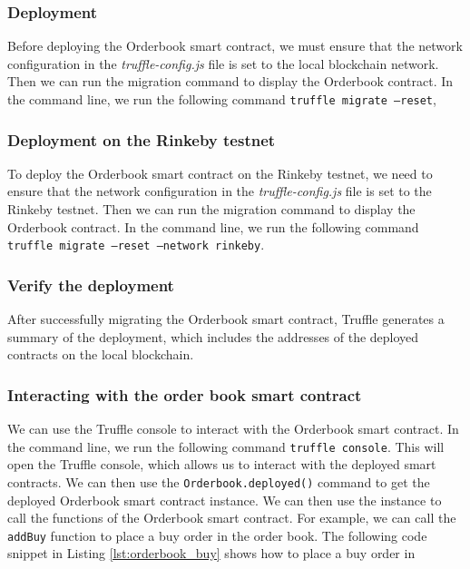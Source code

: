 \subsubsection{Deployment}


Before deploying the Orderbook smart contract, we must ensure that the network configuration in the \textit{truffle-config.js} file is set to the local blockchain
network. Then we can run the migration command to display the Orderbook contract. In the command line, we run the following command \texttt{truffle migrate --reset},


\subsubsection{Deployment on the Rinkeby testnet}


To deploy the Orderbook smart contract on the Rinkeby testnet, we need to ensure that the network configuration in the \textit{truffle-config.js} file is set to the
Rinkeby testnet. Then we can run the migration command to display the Orderbook contract. In the command line, we run the following command \texttt{truffle migrate --reset --network rinkeby}.


\subsubsection{Verify the deployment}


After successfully migrating the Orderbook smart contract, Truffle generates a summary of the deployment, which includes the addresses of the deployed contracts on
the local blockchain.


\subsubsection{Interacting with the order book smart contract}


We can use the Truffle console to interact with the Orderbook smart contract. In the command line, we run the following command \texttt{truffle console}.
This will open the Truffle console, which allows us to interact with the deployed smart contracts. We can then use the \texttt{Orderbook.deployed()} command
to get the deployed Orderbook smart contract instance. We can then use the instance to call the functions of the Orderbook smart contract. For example, we can call
the \texttt{addBuy} function to place a buy order in the order book. The following code snippet in Listing \ref{lst:orderbook_buy} shows how to place a buy order in

